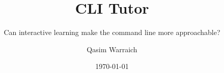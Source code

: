 \documentclass{seal_thesis}
\date{\today}
\title{CLI Tutor}
\subtitle{Can interactive learning make the command line more approachable?}
\author{Qasim Warraich}
\begin{document}
\maketitle

\frontmatter






\tableofcontents
\listoffigures
\listoftables
\lstlistoflistings

\mainmatter






\backmatter





\end{document}
